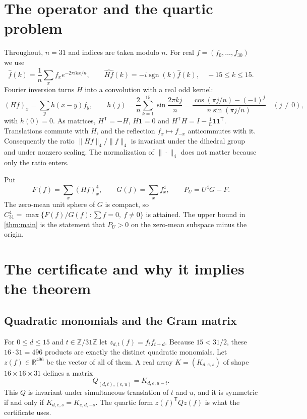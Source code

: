 \documentclass[11pt]{amsart}
\theoremstyle{definition}
\theoremstyle{remark}
\newcommand{\Z}{\mathbb{Z}}
\newcommand{\R}{\mathbb{R}}
\newcommand{\ZN}{\Z/31\Z}
\newcommand{\one}{\mathbf{1}}
\DeclareMathOperator{\sgn}{sgn}
\begin{document}
\section{The operator and the quartic problem}\label{sec:setup}

Throughout, $n=31$ and indices are taken modulo $n$. For real $f=(f_0,\dots,f_{30})$ we use
\[
  \widehat f(k)=\frac1n\sum_{x}f_x e^{-2\pi i kx/n},\qquad
  \widehat{Hf}(k)=-i\sgn(k)\widehat f(k),\quad -15\le k\le 15 .
\]
Fourier inversion turns $H$ into a convolution with a real odd kernel:
\begin{equation}\label{eq:kernel}
  (Hf)_x=\sum_{y}h(x-y)f_y,\qquad
  h(j)=\frac{2}{n}\sum_{k=1}^{15}\sin\frac{2\pi kj}{n}
  =\frac{\cos(\pi j/n)-(-1)^j}{n\sin(\pi j/n)}\quad(j\ne0),
\end{equation}
with $h(0)=0$. As matrices, $H^{\mathsf T}=-H$, $H\one=0$ and $H^{\mathsf T}H=I-\tfrac1n\one\one^{\mathsf T}$. Translations commute with $H$, and the reflection $f_x\mapsto f_{-x}$ anticommutes with it. Consequently the ratio $\|Hf\|_4/\|f\|_4$ is invariant under the dihedral group and under nonzero scaling. The normalization of $\|\cdot\|_4$ does not matter because only the ratio enters.

Put
\[
  F(f)=\sum_x (Hf)_x^4,\qquad G(f)=\sum_x f_x^4,\qquad P_U=U^4G-F .
\]
The zero-mean unit sphere of $G$ is compact, so $C_{31}^4=\max\{F(f)/G(f):\sum f=0,\ f\neq0\}$ is attained. The upper bound in \cref{thm:main} is the statement that $P_U>0$ on the zero-mean subspace minus the origin.

\section{The certificate and why it implies the theorem}\label{sec:certificate}

\subsection{Quadratic monomials and the Gram matrix}
For $0\le d\le15$ and $t\in\ZN$ let $z_{d,t}(f)=f_tf_{t+d}$. Because $15<31/2$, these $16\cdot31=496$ products are exactly the distinct quadratic monomials. Let $z(f)\in\R^{496}$ be the vector of all of them. A real array $K=(K_{d,e,s})$ of shape $16\times16\times31$ defines a matrix
\begin{equation}\label{eq:Q}
  Q_{(d,t),(e,u)}=K_{d,e,u-t}.
\end{equation}
This $Q$ is invariant under simultaneous translation of $t$ and $u$, and it is symmetric if and only if $K_{d,e,s}=K_{e,d,-s}$. The quartic form $z(f)^{\mathsf T}Qz(f)$ is what the certificate uses.
\end{document}
